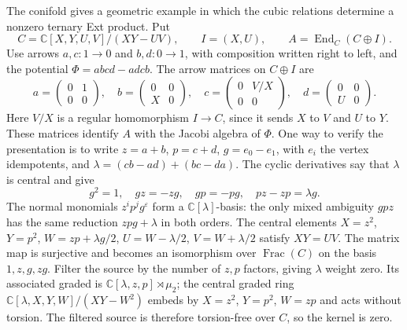 The conifold gives a geometric example in which the cubic relations
determine a nonzero ternary Ext product.  Put
\[
 C=\mathbb C[X,Y,U,V]/(XY-UV),\qquad I=(X,U),\qquad
 A=\operatorname{End}_C(C\oplus I).
\]
Use arrows $a,c:1\to0$ and $b,d:0\to1$, with composition written
right to left, and the potential $\Phi=abcd-adcb$.  The arrow matrices
on $C\oplus I$ are
\[
 a=\begin{pmatrix}0&1\\0&0\end{pmatrix},\quad
 b=\begin{pmatrix}0&0\\X&0\end{pmatrix},\quad
 c=\begin{pmatrix}0&V/X\\0&0\end{pmatrix},\quad
 d=\begin{pmatrix}0&0\\U&0\end{pmatrix}.
\]
Here $V/X$ is a regular homomorphism $I\to C$, since it sends
$X$ to $V$ and $U$ to $Y$.  These matrices identify $A$ with the
Jacobi algebra of $\Phi$.  One way to verify the presentation is to
write $z=a+b$, $p=c+d$, $g=e_0-e_1$, with $e_i$ the vertex
idempotents, and
$\lambda=(cb-ad)+(bc-da)$.  The cyclic derivatives say that
$\lambda$ is central and give
\[
 g^2=1,\quad gz=-zg,\quad gp=-pg,\quad pz-zp=\lambda g.
\]
The normal monomials $z^ip^jg^\varepsilon$ form a
$\mathbb C[\lambda]$-basis: the only mixed ambiguity $gpz$ has the
same reduction $zpg+\lambda$ in both orders.  The central elements
$X=z^2$, $Y=p^2$, $W=zp+\lambda g/2$,
$U=W-\lambda/2$, $V=W+\lambda/2$ satisfy $XY=UV$.
The matrix map is surjective and becomes an isomorphism over
$\operatorname{Frac}(C)$ on the basis $1,z,g,zg$.
Filter the source by the number of $z,p$ factors, giving $\lambda$
weight zero.  Its associated graded is
$\mathbb C[\lambda,z,p]\rtimes\mu_2$; the central graded ring
$\mathbb C[\lambda,X,Y,W]/(XY-W^2)$ embeds by $X=z^2$, $Y=p^2$,
$W=zp$ and acts without torsion.  The filtered source is therefore
torsion-free over $C$, so the kernel is zero.

